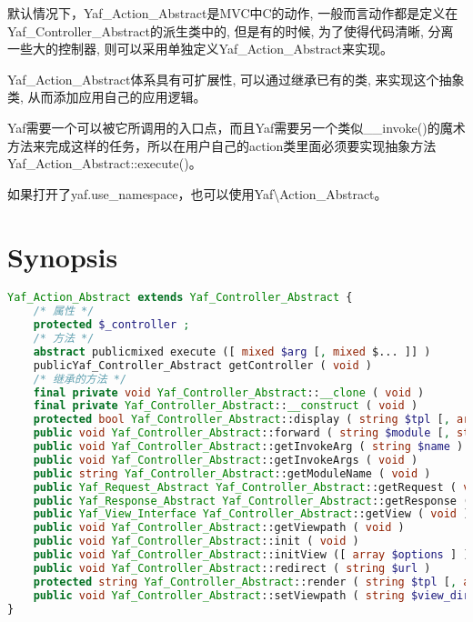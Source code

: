 默认情况下，Yaf\_Action\_Abstract是MVC中C的动作, 一般而言动作都是定义在Yaf\_Controller\_Abstract的派生类中的, 但是有的时候, 为了使得代码清晰, 分离一些大的控制器, 则可以采用单独定义Yaf\_Action\_Abstract来实现。

Yaf\_Action\_Abstract体系具有可扩展性, 可以通过继承已有的类, 来实现这个抽象类, 从而添加应用自己的应用逻辑。






Yaf需要一个可以被它所调用的入口点，而且Yaf需要另一个类似\_\_invoke()的魔术方法来完成这样的任务，所以在用户自己的action类里面必须要实现抽象方法 Yaf\_Action\_Abstract::execute()。

如果打开了yaf.use\_namespace，也可以使用Yaf\textbackslash Action\_Abstract。

\section{Synopsis}


\begin{lstlisting}[language=PHP]
Yaf_Action_Abstract extends Yaf_Controller_Abstract {
    /* 属性 */
    protected $_controller ;
    /* 方法 */
    abstract publicmixed execute ([ mixed $arg [, mixed $... ]] )
    publicYaf_Controller_Abstract getController ( void )
    /* 继承的方法 */
    final private void Yaf_Controller_Abstract::__clone ( void )
    final private Yaf_Controller_Abstract::__construct ( void )
    protected bool Yaf_Controller_Abstract::display ( string $tpl [, array $parameters ] )
    public void Yaf_Controller_Abstract::forward ( string $module [, string $controller [, string $action [, array $paramters ]]] )
    public void Yaf_Controller_Abstract::getInvokeArg ( string $name )
    public void Yaf_Controller_Abstract::getInvokeArgs ( void )
    public string Yaf_Controller_Abstract::getModuleName ( void )
    public Yaf_Request_Abstract Yaf_Controller_Abstract::getRequest ( void )
    public Yaf_Response_Abstract Yaf_Controller_Abstract::getResponse ( void )
    public Yaf_View_Interface Yaf_Controller_Abstract::getView ( void )
    public void Yaf_Controller_Abstract::getViewpath ( void )
    public void Yaf_Controller_Abstract::init ( void )
    public void Yaf_Controller_Abstract::initView ([ array $options ] )
    public void Yaf_Controller_Abstract::redirect ( string $url )
    protected string Yaf_Controller_Abstract::render ( string $tpl [, array $parameters ] )
    public void Yaf_Controller_Abstract::setViewpath ( string $view_directory )
}
\end{lstlisting}

